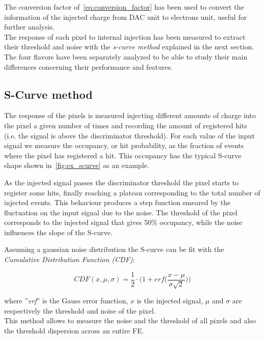 The conversion factor of~\autoref{eq:conversion_factor} has been used to convert the information of the injected charge from DAC unit to electrons unit, useful for further analysis.
\\
The response of each pixel to internal injection has been measured to extract their threshold and noise with the \textit{s-curve method} explained in the next section. 
The four flavors have been separately analyzed to be able to study their main differences concerning their performance and features. 


\subsection{S-Curve method} \label{sec:threshold_subsection}

The response of the pixels is measured injecting different amounts of charge into the pixel a given number of times and recording the amount of registered hits (i.e. the signal is above the discriminator threshold). For each value of the input signal we measure the occupancy, or hit probability, as the fraction of events where the pixel has registered a hit. This occupancy has the typical S-curve shape shown in~\autoref{fig:ex_scurve} as an example. 

As the injected signal passes the discriminator threshold the pixel starts to register some hits, finally reaching a plateau corresponding to the total number of injected events. This behaviour produces a step function smeared by the fluctuation on the input signal due to the noise.  
The threshold of the pixel corresponds to the injected signal  that gives 50\% occupancy, while the noise influences the slope of the S-curve.  

Assuming a gaussian noise distribution the S-curve can be fit with the \textit{Cumulative Distribution Function (CDF)}:

\begin{equation}
 CDF(x,\mu,\sigma) = \frac{1}{2} \cdot \bigg(1 + \textit{erf}\bigg(\frac{x-\mu}{\sigma \sqrt{2}}\bigg)\bigg)
\end{equation}

where ''\textit{erf}'' is the Gauss error function, $x$ is the injected signal, $\mu$ and $\sigma$ are respectively the threshold and noise of the pixel.  \\

This method allows to measure the noise and the threshold of all pixels and also the threshold dispersion across an entire FE.

